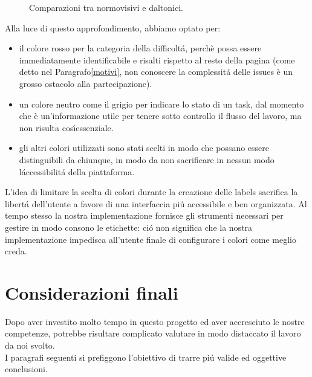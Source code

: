 \documentclass[12pt]{article} %
\begin{document}
\begin{figure}[H]
\caption{Comparazioni tra normovisivi e daltonici.}
\label{fig:daltonici}
\end{figure}

Alla luce di questo approfondimento, abbiamo optato per:
\begin{itemize}
\item il colore rosso per la categoria della difficolt\'a, perch\`e possa essere immediatamente identificabile e risalti rispetto al resto della pagina (come detto nel Paragrafo\ref{motivi}, non conoscere la complessit\'a delle issues \`e un grosso ostacolo alla partecipazione).
\item un colore neutro come il grigio per indicare lo stato di un task, dal momento che \`e un'informazione utile per tenere sotto controllo il flusso del lavoro, ma non risulta cos\'\i essenziale.
\item gli altri colori utilizzati sono stati scelti in modo che possano essere distinguibili da chiunque, in modo da non sacrificare in nessun modo l\'accessibilit\'a della piattaforma.
\end{itemize}
L'idea di limitare la scelta di colori durante la creazione delle labels sacrifica la libert\'a dell'utente a favore di una interfaccia pi\'u accessibile e ben organizzata. Al tempo stesso la nostra implementazione fornisce gli strumenti necessari per gestire in modo consono le etichette: ci\'o non significa che la nostra implementazione impedisca all'utente finale di configurare i colori come meglio creda.

\newpage

\section{Considerazioni finali}
Dopo aver investito molto tempo in questo progetto ed aver accresciuto le nostre competenze, potrebbe risultare complicato valutare in modo distaccato il lavoro da noi svolto.\\
I paragrafi seguenti si prefiggono l'obiettivo di trarre pi\'u valide ed oggettive conclusioni.
\end{document}
